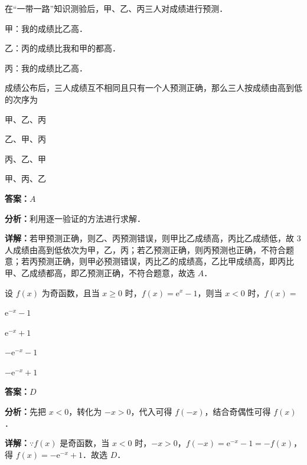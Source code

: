 \begin{question}[points=5]
在“一带一路”知识测验后，甲、乙、丙三人对成绩进行预测．

甲：我的成绩比乙高．

乙：丙的成绩比我和甲的都高．

丙：我的成绩比乙高．

成绩公布后，三人成绩互不相同且只有一个人预测正确，那么三人按成绩由高到低的次序为
\begin{choices}
  \item 甲、乙、丙
  \item 乙、甲、丙
  \item 丙、乙、甲
  \item 甲、丙、乙
\end{choices}
\begin{solution}
\textbf{答案：}$A$

\textbf{分析：}利用逐一验证的方法进行求解．

\textbf{详解：}若甲预测正确，则乙、丙预测错误，则甲比乙成绩高，丙比乙成绩低，故 $3$ 人成绩由高到低依次为甲，乙，丙；若乙预测正确，则丙预测也正确，不符合题意；若丙预测正确，则甲必预测错误，丙比乙的成绩高，乙比甲成绩高，即丙比甲、乙成绩都高，即乙预测正确，不符合题意，故选 $A$．
\end{solution}
\end{question}

\begin{question}[points=5]
设 $f(x)$ 为奇函数，且当 $x\geq 0$ 时，$f(x)=\mathrm{e}^x-1$，则当 $x<0$ 时，$f(x)=$
\begin{choices}
  \item $\mathrm{e}^{-x}-1$
  \item $\mathrm{e}^{-x}+1$
  \item $-\mathrm{e}^{-x}-1$
  \item $-\mathrm{e}^{-x}+1$
\end{choices}
\begin{solution}
\textbf{答案：}$D$

\textbf{分析：}先把 $x<0$，转化为 $-x>0$，代入可得 $f(-x)$，结合奇偶性可得 $f(x)$．

\textbf{详解：}$\because f(x)$ 是奇函数，当 $x<0$ 时，$-x>0$，$f(-x)=\mathrm{e}^{-x}-1=-f(x)$，得 $f(x)=-\mathrm{e}^{-x}+1$．故选 $D$．
\end{solution}
\end{question}

